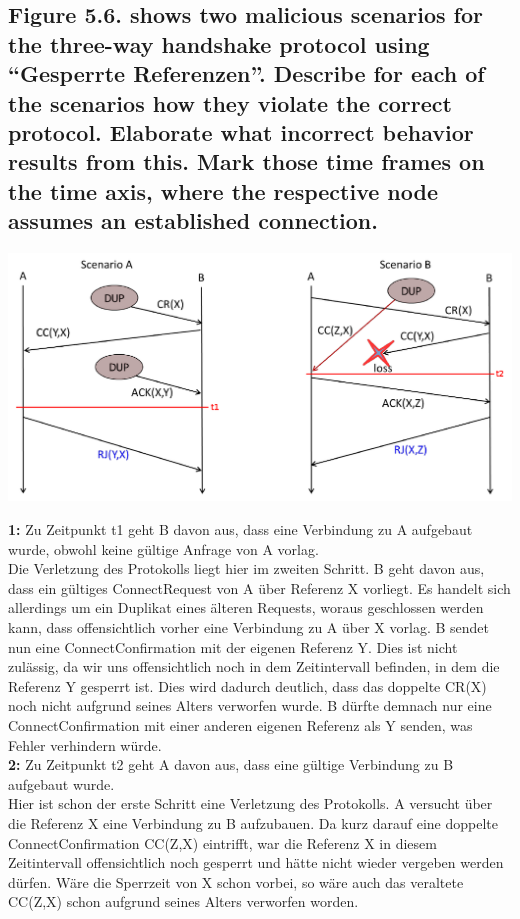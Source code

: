 \documentclass[a4paper,
			llpt,
			solution,
			accentcolor=tud2d,
			colorbacktitle
			]
			{tudexercise}
\begin{document}
\subsection{Figure 5.6. shows two malicious scenarios for the three-way handshake protocol using “Gesperrte Referenzen”. Describe for each of the scenarios how they violate the correct protocol. Elaborate what incorrect behavior results from this. Mark those time frames on the time axis, where the respective node assumes an established connection.}
\begin{center}
\includegraphics[scale=1.5]{5.png}
\end{center}
\textbf{1:} Zu Zeitpunkt t1 geht B davon aus, dass eine Verbindung zu A aufgebaut wurde, obwohl keine gültige Anfrage von A vorlag.\\
Die Verletzung des Protokolls liegt hier im zweiten Schritt. B geht davon aus, dass ein gültiges ConnectRequest von A über Referenz X vorliegt. Es handelt sich allerdings um ein Duplikat eines älteren Requests, woraus geschlossen werden kann, dass offensichtlich vorher eine Verbindung zu A über X vorlag. B sendet nun eine ConnectConfirmation mit der eigenen Referenz Y. Dies ist nicht zulässig, da wir uns offensichtlich noch in dem Zeitintervall befinden, in dem die Referenz Y gesperrt ist. Dies wird dadurch deutlich, dass das doppelte CR(X) noch nicht aufgrund seines Alters verworfen wurde. B dürfte demnach nur eine ConnectConfirmation mit einer anderen eigenen Referenz als Y senden, was Fehler verhindern würde.\\
\textbf{2:} Zu Zeitpunkt t2 geht A davon aus, dass eine gültige Verbindung zu B aufgebaut wurde.\\
Hier ist schon der erste Schritt eine Verletzung des Protokolls. A versucht über die Referenz X eine Verbindung zu B aufzubauen. Da kurz darauf eine doppelte ConnectConfirmation CC(Z,X) eintrifft, war die Referenz X in diesem Zeitintervall offensichtlich noch gesperrt und hätte nicht wieder vergeben werden dürfen. Wäre die Sperrzeit von X schon vorbei, so wäre auch das veraltete CC(Z,X) schon aufgrund seines Alters verworfen worden.
\clearpage
\end{document}
